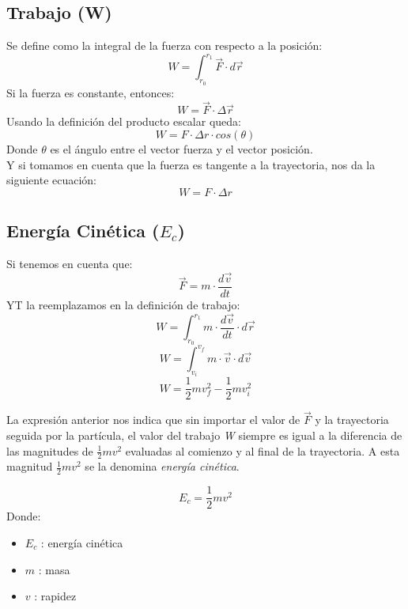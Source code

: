\documentclass[../main.tex]{subfiles}
\begin{document}
\subsection{Trabajo (W)}
Se define como la integral de la fuerza con respecto a la posición:
\[ W = \int_{r_0}^{r_1} \vec{F} \cdot d \vec{r} \]
Si la fuerza es constante, entonces:
\[ W = \vec{F} \cdot \Delta \vec{r} \]
Usando la definición del producto escalar queda:
\[ W = F \cdot \Delta r \cdot cos(\theta)\]
Donde $\theta$ es el ángulo entre el vector fuerza y el vector posición.\\
Y si tomamos en cuenta que la fuerza es tangente a la trayectoria,
nos da la siguiente ecuación:
\[ W = F \cdot \Delta r \]

\subsection{Energía Cinética ($E_c$)}
Si tenemos en cuenta que:
\[ \vec{F} = m \cdot \frac{d \vec{v}}{dt} \]
YT la reemplazamos en la definición de trabajo:
\[ W = \int_{r_0}^{r_1} m \cdot \frac{d \vec{v}}{dt} \cdot d \vec{r} \]
\[ W = \int_{v_i}^{v_f} m \cdot \vec{v} \cdot d \vec{v} \]
\[ W = \frac{1}{2}mv_f^2 - \frac{1}{2}mv_i^2 \]

La expresión anterior nos indica que sin importar el valor de \(\vec{F}\) y la 
trayectoria seguida por la partícula, el valor del trabajo \textit{W}
siempre es igual a la diferencia de las magnitudes de 
\(\frac{1}{2}mv^2\) evaluadas al comienzo y al final de la
 trayectoria. A esta magnitud \(\frac{1}{2}mv^2 \) se la denomina
\textit{energía cinética}.

\[E_c = \frac{1}{2}mv^2 \]
Donde:
\begin{itemize}
    \item $E_c$ : energía cinética
    \item $m$ : masa
    \item $v$ : rapidez
\end{itemize}
\end{document}
